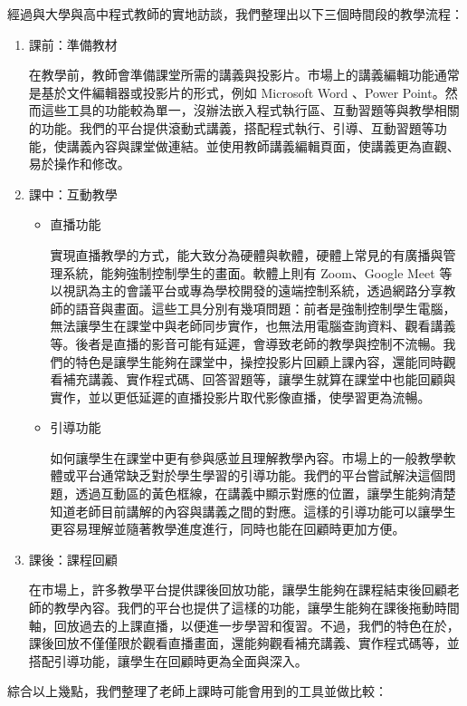 \documentclass[12pt]{article}
\begin{document}
經過與大學與高中程式教師的實地訪談，我們整理出以下三個時間段的教學流程：

\begin{enumerate}[label=(\arabic*)]
  \setlength{\parindent}{2em}
  \item 課前：準備教材
    \par 在教學前，教師會準備課堂所需的講義與投影片。市場上的講義編輯功能通常是基於文件編輯器或投影片的形式，例如 Microsoft Word 、Power Point。然而這些工具的功能較為單一，沒辦法嵌入程式執行區、互動習題等與教學相關的功能。我們的平台提供滾動式講義，搭配程式執行、引導、互動習題等功能，使講義內容與課堂做連結。並使用教師講義編輯頁面，使講義更為直觀、易於操作和修改。
  \item 課中：互動教學
  \begin{itemize}
    \setlength{\parindent}{2em}
    \item 直播功能
      \par 實現直播教學的方式，能大致分為硬體與軟體，硬體上常見的有廣播與管理系統，能夠強制控制學生的畫面。軟體上則有 Zoom、Google Meet 等以視訊為主的會議平台或專為學校開發的遠端控制系統，透過網路分享教師的語音與畫面。這些工具分別有幾項問題：前者是強制控制學生電腦，無法讓學生在課堂中與老師同步實作，也無法用電腦查詢資料、觀看講義等。後者是直播的影音可能有延遲，會導致老師的教學與控制不流暢。我們的特色是讓學生能夠在課堂中，操控投影片回顧上課內容，還能同時觀看補充講義、實作程式碼、回答習題等，讓學生就算在課堂中也能回顧與實作，並以更低延遲的直播投影片取代影像直播，使學習更為流暢。
    \item 引導功能
      \par 如何讓學生在課堂中更有參與感並且理解教學內容。市場上的一般教學軟體或平台通常缺乏對於學生學習的引導功能。我們的平台嘗試解決這個問題，透過互動區的黃色框線，在講義中顯示對應的位置，讓學生能夠清楚知道老師目前講解的內容與講義之間的對應。這樣的引導功能可以讓學生更容易理解並隨著教學進度進行，同時也能在回顧時更加方便。
  \end{itemize}
  \item 課後：課程回顧
  \par 在市場上，許多教學平台提供課後回放功能，讓學生能夠在課程結束後回顧老師的教學內容。我們的平台也提供了這樣的功能，讓學生能夠在課後拖動時間軸，回放過去的上課直播，以便進一步學習和復習。不過，我們的特色在於，課後回放不僅僅限於觀看直播畫面，還能夠觀看補充講義、實作程式碼等，並搭配引導功能，讓學生在回顧時更為全面與深入。\\
\end{enumerate}

\par 綜合以上幾點，我們整理了老師上課時可能會用到的工具並做比較：
\end{document}
